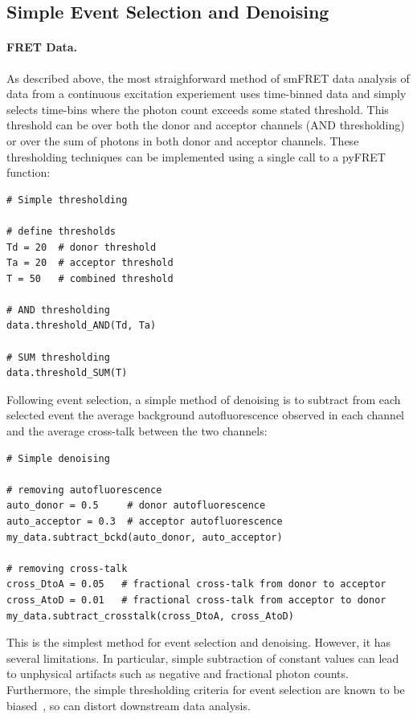 \subsection{Simple Event Selection and Denoising}
\paragraph{FRET Data.}
As described above, the most straighforward method of smFRET data analysis of data from a continuous excitation experiement uses time-binned data and simply selects time-bins where the photon count exceeds some stated threshold. This threshold can be over  both the donor and acceptor channels (AND thresholding) or over the sum of photons in both donor and acceptor channels. These thresholding techniques can be implemented using a single call to a pyFRET function: 

\begin{lstlisting}
# Simple thresholding

# define thresholds
Td = 20  # donor threshold
Ta = 20  # acceptor threshold
T = 50   # combined threshold

# AND thresholding
data.threshold_AND(Td, Ta)

# SUM thresholding
data.threshold_SUM(T)
\end{lstlisting}

Following event selection, a simple method of denoising is to subtract from each selected event the average background autofluorescence observed in each channel and the average cross-talk between the two channels:

\begin{lstlisting}
# Simple denoising

# removing autofluorescence
auto_donor = 0.5     # donor autofluorescence
auto_acceptor = 0.3  # acceptor autofluorescence
my_data.subtract_bckd(auto_donor, auto_acceptor)

# removing cross-talk
cross_DtoA = 0.05   # fractional cross-talk from donor to acceptor
cross_AtoD = 0.01   # fractional cross-talk from acceptor to donor
my_data.subtract_crosstalk(cross_DtoA, cross_AtoD)
\end{lstlisting}

This is the simplest method for event selection and denoising. However, it has several limitations. In particular, simple subtraction of constant values can lead to unphysical artifacts such as negative and fractional photon counts. Furthermore, the simple thresholding criteria for event selection are known to be biased~\cite{nir06}, so can distort downstream data analysis. 

